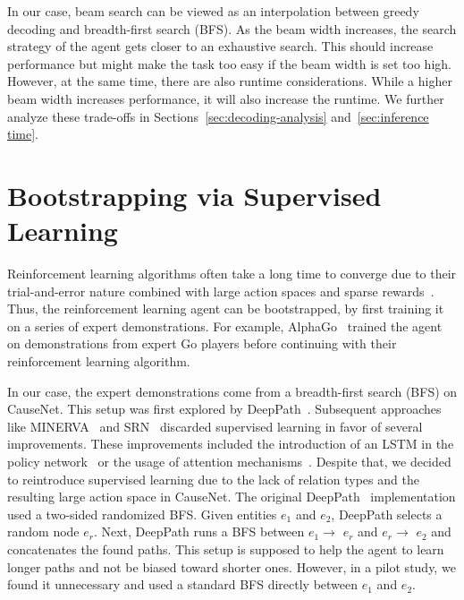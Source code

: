 In our case, beam search can be viewed as an interpolation between greedy decoding and breadth-first search (BFS).
As the beam width increases, the search strategy of the agent gets closer to an exhaustive search.
This should increase performance but might make the task too easy if the beam width is set too high.
However, at the same time, there are also runtime considerations. While a higher beam width increases performance, it will also increase the runtime.
We further analyze these trade-offs in Sections~\ref{sec:decoding-analysis} and~\ref{sec:inference time}.

\section{Bootstrapping via Supervised Learning}
\label{sec:supervised}

Reinforcement learning algorithms often take a long time to converge due to their
trial-and-error nature combined with large action spaces and sparse rewards~\cite{Xiong2017DeePpath, Lin2020RewardShaping}.
Thus, the reinforcement learning agent can be bootstrapped, by first training
it on a series of expert demonstrations. For example, AlphaGo~\cite{Silver2016AlphaGO} trained 
the agent on demonstrations from expert Go players before continuing with their reinforcement learning
algorithm.

In our case, the expert demonstrations come from a breadth-first search (BFS)
on CauseNet. This setup was first explored by DeepPath~\cite{Xiong2017DeePpath}.
Subsequent approaches like MINERVA~\cite{Das2018Minerva} and SRN~\cite{Qiu2020Stepwise} discarded
supervised learning in favor of several improvements. These improvements included the introduction 
of an LSTM in the policy network~\cite{Das2018Minerva} or the usage of attention mechanisms~\cite{Qiu2020Stepwise}.
Despite that, we decided to reintroduce supervised learning
due to the lack of relation types and the resulting large action space in CauseNet.
The original DeepPath~\cite{Xiong2017DeePpath} implementation used a two-sided randomized BFS.
Given entities $e_1$ and $e_2$, DeepPath selects a random node $e_r$. Next, DeepPath runs a 
BFS between $e_1 \rightarrow$ $e_r$ and $e_r \rightarrow$ $e_2$ and concatenates the found paths. This setup is supposed 
to help the agent to learn longer paths and not be biased toward shorter ones. However, in a pilot study, we found it unnecessary 
and used a standard BFS directly between $e_1$ and $e_2$.

